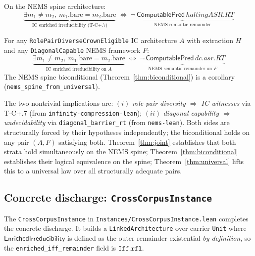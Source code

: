 \documentclass[11pt]{article}
\newcommand{\EnrIrr}{\ensuremath{\mathsf{EnrichedIrreducibility}}}
\begin{document}
\begin{theorem}
\label{thm:biconditional}
On the NEMS spine architecture:
\[
\underbrace{\exists m_1 \neq m_2,\ m_1.\text{bare} = m_2.\text{bare}}_{\text{IC enriched irreducibility (T-C+.7)}}
\;\Longleftrightarrow\;
\underbrace{\neg\,\mathsf{ComputablePred}\,\mathit{haltingASR.RT}}_{\text{NEMS semantic remainder}}
\]
\par{}
\end{theorem}

\begin{theorem}
\label{thm:universal}
For any \texttt{RolePairDiverseCrownEligible} IC architecture $A$ with extraction $H$
and any \texttt{DiagonalCapable} NEMS framework $F$:
\[
\underbrace{\exists m_1 \neq m_2,\ m_1.\text{bare} = m_2.\text{bare}}_{\text{IC enriched irreducibility on }A}
\;\Longleftrightarrow\;
\underbrace{\neg\,\mathsf{ComputablePred}\,\mathit{dc.asr.RT}}_{\text{NEMS semantic remainder on }F}
\]
The NEMS spine biconditional (Theorem~\ref{thm:biconditional}) is a corollary
(\texttt{nems\_spine\_from\_universal}).
\par{}
\end{theorem}

The two nontrivial implications are:
$(i)$ \emph{role-pair diversity $\Rightarrow$ IC witnesses} via T-C+.7 (from \texttt{infinity-compression-lean});
$(ii)$ \emph{diagonal capability $\Rightarrow$ undecidability} via \texttt{diagonal\_barrier\_rt} (from \texttt{nems-lean}).
Both sides are structurally forced by their hypotheses independently; the biconditional
holds on any pair $(A, F)$ satisfying both.  Theorem~\ref{thm:joint} establishes
that both strata hold simultaneously on the NEMS spine;
Theorem~\ref{thm:biconditional} establishes their logical equivalence on the spine;
Theorem~\ref{thm:universal} lifts this to a universal law over all structurally
adequate pairs.

\subsection{Concrete discharge: \texttt{CrossCorpusInstance}}

The \texttt{CrossCorpusInstance} in \texttt{Instances/CrossCorpusInstance.lean} completes
the concrete discharge.  It builds a \texttt{LinkedArchitecture} over carrier \texttt{Unit}
where $\EnrIrr$ is defined as the outer remainder existential \emph{by definition}, so
the \texttt{enriched\_iff\_remainder} field is $\mathtt{Iff.rfl}$.
\end{document}
